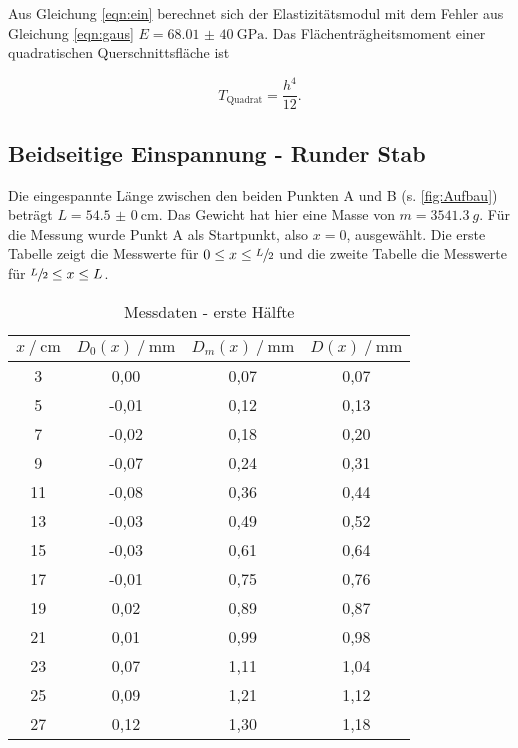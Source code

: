 Aus Gleichung \eqref{eqn:ein} berechnet sich der Elastizitätsmodul mit dem Fehler aus Gleichung \eqref{eqn:gaus}
$E = \SI{68,01(40)}{\giga \pascal}$.
Das Flächenträgheitsmoment einer quadratischen Querschnittsfläche \cite{traeg} ist

\begin{equation}
  T_{\text{Quadrat}} = \frac{h^4}{12}.
\end{equation}

\subsection{Beidseitige Einspannung - Runder Stab}

Die eingespannte Länge zwischen den beiden Punkten A und B (s. \ref{fig:Aufbau}) beträgt $L = \SI{54,5(0)}{\cm}$.
Das Gewicht hat hier eine Masse von $m=\SI{3541,3}{g}$.
Für die Messung wurde Punkt A als Startpunkt, also $x = 0$, ausgewählt.
Die erste Tabelle zeigt die Messwerte für $0 \leq x \leq \sfrac{L}{2}$
und die zweite Tabelle die Messwerte für $\sfrac{L}{2} \leq x \leq L$.

\begin{table}[H]
  \centering
  \caption{Messdaten - erste Hälfte}
  \label{tab:rundbeid1}
  \begin{tabular}{S S S S}
    \toprule
      {$x \:/\: \mathrm{cm}$} & {$D_0(x) \:/\: \mathrm{mm}$} & {$D_m(x)  \:/\: \mathrm{mm}$} &
      {$D(x) \:/\: \mathrm{mm}$}\\
      &  0,00  &  0,07  &  0,07    \\
    5  &  -0,01  &  0,12  &  0,13   \\
    7  &  -0,02  &  0,18  &  0,20   \\
    9  &  -0,07  &  0,24  &  0,31   \\
    11  &  -0,08  &  0,36  &  0,44  \\
    13  &  -0,03  &  0,49  &  0,52  \\
    15  &  -0,03  &  0,61  &  0,64  \\
    17  &  -0,01  &  0,75  &  0,76  \\
    19  &  0,02  &  0,89  &  0,87   \\
    21  &  0,01  &  0,99  &  0,98   \\
    23  &  0,07  &  1,11  &  1,04   \\
    25  &  0,09  &  1,21  &  1,12   \\
    27  &  0,12  &  1,30  &  1,18   \\
    \bottomrule
  \end{tabular}
\end{table}


